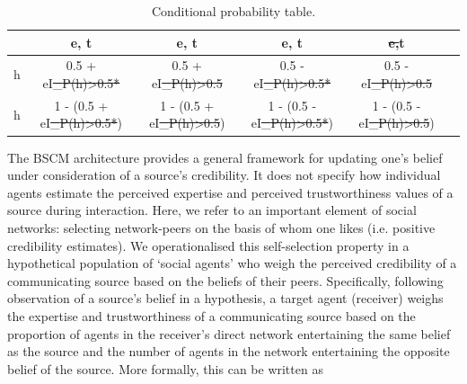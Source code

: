 \documentclass[fleqn,10pt]{wlscirep}
\providecommand{\DIFadd}[1]{{\protect\color{blue}\uwave{#1}}} %
\providecommand{\DIFdel}[1]{{\protect\color{red}\sout{#1}}}                      %
\providecommand{\DIFaddFL}[1]{\DIFadd{#1}} %
\providecommand{\DIFdelFL}[1]{\DIFdel{#1}} %
\providecommand{\DIFaddbeginFL}{} %
\providecommand{\DIFaddendFL}{} %
\providecommand{\DIFdelbeginFL}{} %
\providecommand{\DIFdelendFL}{} %
\begin{document}
\begin{table}[ht]
\label{tab:bscm_details}
\centering
\DIFdelbeginFL %
\DIFdelendFL \DIFaddbeginFL \begin{tabular}{|c|c|c|c|c|c}

\DIFaddendFL \hline
& e, t & \DIFdelbeginFL \DIFdelFL{\neg }\DIFdelendFL \DIFaddbeginFL \DIFaddFL{\(\neg\)}\DIFaddendFL e, t & e, \DIFdelbeginFL \DIFdelFL{\neg }\DIFdelendFL \DIFaddbeginFL \DIFaddFL{\(\neg\)}\DIFaddendFL t & \DIFdelbeginFL \DIFdelFL{\neg e,\neg }\DIFdelendFL \DIFaddbeginFL \DIFaddFL{\(\neg\)e,\(\neg\)}\DIFaddendFL t\\
\hline
h & 0.5 + eI\DIFdelbeginFL \DIFdelFL{_{P(h)>0.5}*\tau }\DIFdelendFL \DIFaddbeginFL \DIFaddFL{\(_{P(h)>0.5}\)\(\times\)\(\tau\) }\DIFaddendFL & 0.5 + eI\DIFdelbeginFL \DIFdelFL{_{P(h)>0.5} }\DIFdelendFL \DIFaddbeginFL \DIFaddFL{\(_{P(h)>0.5}\) }\DIFaddendFL & 0.5 - eI\DIFdelbeginFL \DIFdelFL{_{P(h)>0.5}*\tau  }\DIFdelendFL \DIFaddbeginFL \DIFaddFL{\(_{(P(h)>0.5}\)\(\times\)\(\tau\) }\DIFaddendFL &  0.5 - eI\DIFdelbeginFL \DIFdelFL{_{P(h)>0.5}}\DIFdelendFL \DIFaddbeginFL \DIFaddFL{\(_{(P(h)>0.5}\)}\DIFaddendFL \\
\DIFaddbeginFL 

\DIFaddendFL \hline
\DIFdelbeginFL \DIFdelFL{\neg }\DIFdelendFL \DIFaddbeginFL \DIFaddFL{\(\neg\)}\DIFaddendFL h & 1 - (0.5 + eI\DIFdelbeginFL \DIFdelFL{_{P(h)>0.5}*\tau}\DIFdelendFL \DIFaddbeginFL \DIFaddFL{\(_{P(h)>0.5}\)\(\times\)\(\tau\)}\DIFaddendFL ) & 1 - (0.5 + eI\DIFdelbeginFL \DIFdelFL{_{P(h)>0.5}}\DIFdelendFL \DIFaddbeginFL \DIFaddFL{\(_{P(h)>0.5}\)}\DIFaddendFL ) & 1 - (0.5 - eI\DIFdelbeginFL \DIFdelFL{_{P(h)>0.5}*\tau}\DIFdelendFL \DIFaddbeginFL \DIFaddFL{\(_{P(h)>0.5}\)\(\times\)\(\tau\)}\DIFaddendFL ) & 1 - (0.5 - eI\DIFdelbeginFL \DIFdelFL{_{P(h)>0.5}}\DIFdelendFL \DIFaddbeginFL \DIFaddFL{\(_{P(h)>0.5}\)}\DIFaddendFL )\\
\DIFaddbeginFL 

\DIFaddendFL \hline
\end{tabular}
\caption{\label{tab:t2}Conditional probability table.}
\end{table}


The BSCM architecture provides a general framework for updating one's belief under consideration of a source's credibility. It does not specify how individual agents estimate the perceived expertise and perceived trustworthiness values of a source during interaction. Here, we refer to an important element of social networks: selecting network-peers on the basis of whom one likes (i.e. positive credibility estimates). We operationalised this self-selection property in a hypothetical population of `social agents' who weigh the perceived credibility of a communicating source based on the beliefs of their peers. Specifically, following observation of a source's belief in a hypothesis, a target agent (receiver) weighs the expertise and trustworthiness of a communicating source based on the proportion of agents in the receiver's direct network entertaining the same belief as the source and the number of agents in the network entertaining the opposite belief of the source. More formally, this can be written as  
\end{document}
